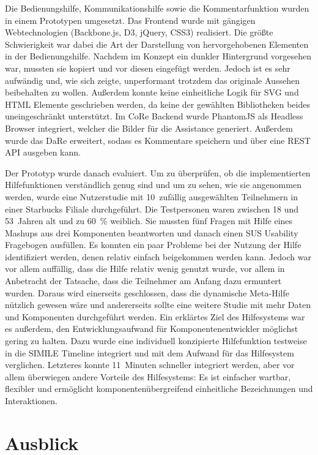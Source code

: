 \documentclass[
	headsepline,
	footsepline,
	fontsize=12pt,
	bibliography=totoc
]{scrbook}
\begin{document}

Die Bedienungshilfe, Kommunikationshilfe sowie die Kommentarfunktion wurden in einem Prototypen umgesetzt. Das Frontend wurde mit gängigen Webtechnologien (Backbone.js, D3, jQuery, CSS3) realisiert. Die größte Schwierigkeit war dabei die Art der Darstellung von hervorgehobenen Elementen in der Bedienungshilfe. Nachdem im Konzept ein dunkler Hintergrund vorgesehen war, mussten sie kopiert und vor diesen eingefügt werden. Jedoch ist es sehr aufwändig und, wie sich zeigte, unperformant trotzdem das originale Aussehen beibehalten zu wollen. Außerdem konnte keine einheitliche Logik für SVG und HTML Elemente geschrieben werden, da keine der gewählten Bibliotheken beides uneingeschränkt unterstützt. Im CoRe Backend wurde PhantomJS als Headless Browser integriert, welcher die Bilder für die Assistance generiert. Außerdem wurde das DaRe erweitert, sodass es Kommentare speichern und über eine REST API ausgeben kann.


Der Prototyp wurde danach evaluiert. Um zu überprüfen, ob die implementierten Hilfefunktionen verständlich genug sind und um zu sehen, wie sie angenommen werden, wurde eine Nutzerstudie mit 10~zufällig ausgewählten Teilnehmern in einer Starbucks Filiale durchgeführt. Die Testpersonen waren zwischen 18 und 53~Jahren alt und zu 60~\% weiblich. Sie mussten fünf Fragen mit Hilfe eines Mashups aus drei Komponenten beantworten und danach einen SUS Usability Fragebogen ausfüllen. Es konnten ein paar Probleme bei der Nutzung der Hilfe identifiziert werden, denen relativ einfach beigekommen werden kann. Jedoch war vor allem auffällig, dass die Hilfe relativ wenig genutzt wurde, vor allem in Anbetracht der Tatsache, dass die Teilnehmer am Anfang dazu ermuntert wurden. Daraus wird einerseits geschlossen, dass die dynamische Meta-Hilfe nützlich gewesen wäre und andererseits sollte eine weitere Studie mit mehr Daten und Komponenten durchgeführt werden. Ein erklärtes Ziel des Hilfesystems war es außerdem, den Entwicklungsaufwand für Komponentenentwickler möglichst gering zu halten. Dazu wurde eine individuell konzipierte Hilfefunktion testweise in die SIMILE Timeline integriert und mit dem Aufwand für das Hilfesystem verglichen. Letzteres konnte 11~Minuten schneller integriert werden, aber vor allem überwiegen andere Vorteile des Hilfesystems: Es ist einfacher wartbar, flexibler und ermöglicht komponentenübergreifend einheitliche Bezeichnungen und Interaktionen.

\section{Ausblick}
\end{document}
